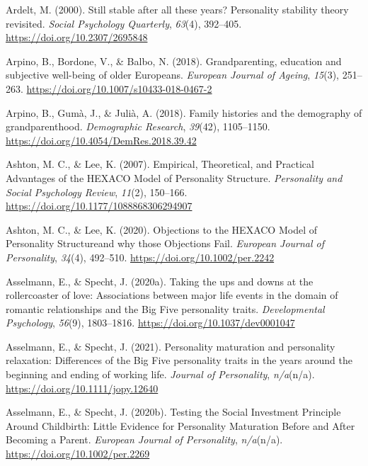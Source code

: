 \documentclass[
  english,
  man, noextraspace]{apa7}
\begin{document}
\leavevmode\hypertarget{ref-ardeltStillStableAll2000}{}%
Ardelt, M. (2000). Still stable after all these years? Personality stability theory revisited. \emph{Social Psychology Quarterly}, \emph{63}(4), 392--405. \url{https://doi.org/10.2307/2695848}

\leavevmode\hypertarget{ref-arpinoGrandparentingEducationSubjective2018}{}%
Arpino, B., Bordone, V., \& Balbo, N. (2018). Grandparenting, education and subjective well-being of older Europeans. \emph{European Journal of Ageing}, \emph{15}(3), 251--263. \url{https://doi.org/10.1007/s10433-018-0467-2}

\leavevmode\hypertarget{ref-arpinoFamilyHistoriesDemography2018}{}%
Arpino, B., Gumà, J., \& Julià, A. (2018). Family histories and the demography of grandparenthood. \emph{Demographic Research}, \emph{39}(42), 1105--1150. \url{https://doi.org/10.4054/DemRes.2018.39.42}

\leavevmode\hypertarget{ref-ashtonEmpiricalTheoreticalPractical2007}{}%
Ashton, M. C., \& Lee, K. (2007). Empirical, Theoretical, and Practical Advantages of the HEXACO Model of Personality Structure. \emph{Personality and Social Psychology Review}, \emph{11}(2), 150--166. \url{https://doi.org/10.1177/1088868306294907}

\leavevmode\hypertarget{ref-ashtonObjectionsHEXACOModel2020}{}%
Ashton, M. C., \& Lee, K. (2020). Objections to the HEXACO Model of Personality Structureand why those Objections Fail. \emph{European Journal of Personality}, \emph{34}(4), 492--510. \url{https://doi.org/10.1002/per.2242}

\leavevmode\hypertarget{ref-asselmannTakingUpsDowns2020}{}%
Asselmann, E., \& Specht, J. (2020a). Taking the ups and downs at the rollercoaster of love: Associations between major life events in the domain of romantic relationships and the Big Five personality traits. \emph{Developmental Psychology}, \emph{56}(9), 1803--1816. \url{https://doi.org/10.1037/dev0001047}

\leavevmode\hypertarget{ref-asselmannPersonalityMaturationPersonality2021}{}%
Asselmann, E., \& Specht, J. (2021). Personality maturation and personality relaxation: Differences of the Big Five personality traits in the years around the beginning and ending of working life. \emph{Journal of Personality}, \emph{n/a}(n/a). \url{https://doi.org/10.1111/jopy.12640}

\leavevmode\hypertarget{ref-asselmannTestingSocialInvestment2020}{}%
Asselmann, E., \& Specht, J. (2020b). Testing the Social Investment Principle Around Childbirth: Little Evidence for Personality Maturation Before and After Becoming a Parent. \emph{European Journal of Personality}, \emph{n/a}(n/a). \url{https://doi.org/10.1002/per.2269}
\end{document}
